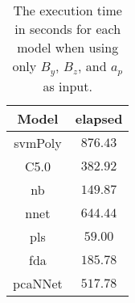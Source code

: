 \begin{table}[!ht]
	\centering
	\begin{tabular}{|c|c|}
		\hline
		Model & elapsed \\ \hline
		svmPoly & $876.43$ \\ \hline
		C5.0 & $382.92$ \\ \hline
		nb & $149.87$ \\ \hline
		nnet & $644.44$ \\ \hline
		pls & $59.00$ \\ \hline
		fda & $185.78$ \\ \hline
		pcaNNet & $517.78$ \\ \hline
	\end{tabular}
	\caption{The execution time in seconds for each model when using only $B_{y}$, $B_{z}$, and $a_{p}$ as input.}
	\label{tab:time:yzap:total}
\end{table}
